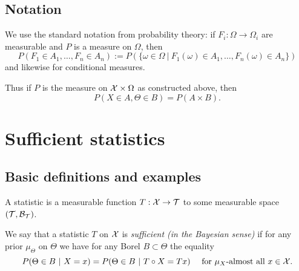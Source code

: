 \documentclass[twoside, a4paper, 10pt]{amsart}
\begin{document}
\subsection{Notation} We use the standard notation from probability theory: if $F_i:\Omega \to \Omega_i$ are measurable and $P$ is a measure on $\Omega$, then $$P(F_1 \in A_1, \ldots, F_n \in A_n) := P(\{\omega \in \Omega ~|~  F_1(\omega) \in A_1, \ldots, F_n(\omega) \in A_n \})$$ and likewise for conditional measures.

Thus if $P$ is the measure on $\mathcal{X} \times \Omega$ as constructed above, then $$P(X \in A, \Theta \in B) = P(A \times B).$$ 

\section{Sufficient statistics}

\subsection{Basic definitions and examples}

A statistic is a measurable function $T:\mathcal{X} \to \mathcal{T}$ to some measurable space $(\mathcal{T}, \mathcal{B}_{\mathcal{T}})$.  

\begin{mydef} We say that a statistic $T$ on $\mathcal{X}$ is \textit{sufficient (in the Bayesian sense)} if for any prior $\mu_{\Theta}$ on $\Theta$ we have for any Borel $B \subset \Theta$ the equality $$P(\Theta \in B ~|~ X = x) = P(\Theta \in B ~|~ T \circ X = Tx) \quad \text{ for } \mu_X\text{-almost all } x \in \mathcal{X}.$$

\end{mydef}
\end{document}
